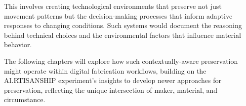 This involves creating technological environments that preserve not just movement patterns but the decision-making processes that inform adaptive responses to changing conditions. Such systems would document the reasoning behind technical choices and the environmental factors that influence material behavior.

\vspace{0.5cm}

The following chapters will explore how such contextually-aware preservation might operate within digital fabrication workflows, building on the AI.RTISANSHIP experiment's insights to develop newer approaches for preservation, reflecting the unique intersection of maker, material, and circumstance.































































